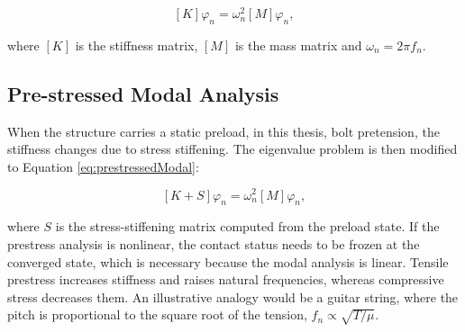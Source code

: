 \documentclass[a4paper,twoside]{bth}
\begin{document}
\begin{equation} \label{eq:modalEigen}
    [K]\varphi_n = \omega^2_n[M]\varphi_n,
\end{equation}

where $[K]$ is the stiffness matrix, $[M]$ is the mass matrix and $\omega_n = 2\pi f_n$.

\subsection{Pre-stressed Modal Analysis}

When the structure carries a static preload, in this thesis, bolt pretension, the stiffness changes due to stress stiffening. The eigenvalue problem is then modified to Equation \ref{eq:prestressedModal}:

\begin{equation} \label{eq:prestressedModal}
    [K+S]\varphi_n = \omega_n^2[M]\varphi_n,
\end{equation}

where $S$ is the stress-stiffening matrix computed from the preload state. If the prestress analysis is nonlinear, the contact status needs to be frozen at the converged state, which is necessary because the modal analysis is linear. Tensile prestress increases stiffness and raises natural frequencies, whereas compressive stress decreases them. An illustrative analogy would be a guitar string, where the pitch is proportional to the square root of the tension, $f_n \propto \sqrt{T/\mu}$. %
\end{document}

